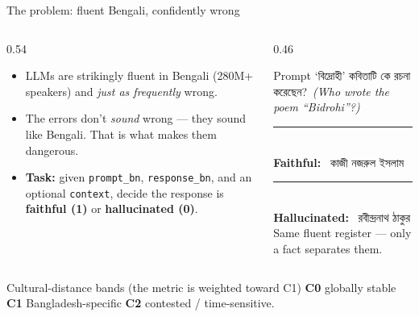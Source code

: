 \documentclass[aspectratio=169,11pt,t]{beamer}
\newcommand{\bn}[1]{{\bnfont #1}}
\newcommand{\bng}[2]{{\bnfont #1}~{\footnotesize\itshape\color{soft}(#2)}}
\newcommand{\metric}[1]{{\color{primary}\bfseries #1}}
\newcommand{\good}[1]{{\color{good}\bfseries #1}}
\newcommand{\bad}[1]{{\color{bad}\bfseries #1}}
\begin{document}
\begin{frame}{The problem: fluent Bengali, confidently wrong}
  \begin{columns}[T]
    \begin{column}{0.54\textwidth}
      \begin{itemize}
        \item LLMs are strikingly fluent in Bengali (280M+ speakers) and \emph{just as frequently} wrong.
        \item The errors don't \emph{sound} wrong — they sound like Bengali. That is what makes them dangerous.
        \item \textbf{Task:} given \texttt{prompt\_bn}, \texttt{response\_bn}, and an optional \texttt{context}, decide the response is \good{faithful (1)} or \bad{hallucinated (0)}.
      \end{itemize}
    \end{column}
    \begin{column}{0.46\textwidth}
      \small
      \begin{block}{Prompt}
        `\bn{বিদ্রোহী}' \bng{কবিতাটি কে রচনা করেছেন?}{Who wrote the poem ``Bidrohi''?}
      \end{block}
      \vspace{-0.2em}
      {\color{good}\rule{\linewidth}{1pt}}\\[-0.1em]
      \good{Faithful:}~ \bn{কাজী নজরুল ইসলাম}\\[0.5em]
      {\color{bad}\rule{\linewidth}{1pt}}\\[-0.1em]
      \bad{Hallucinated:}~ \bn{রবীন্দ্রনাথ ঠাকুর}\\[0.3em]
      {\footnotesize\color{soft} Same fluent register — only a fact separates them.}
    \end{column}
  \end{columns}
  \vspace{0.15em}
  \begin{block}{Cultural-distance bands \;\textmd{\small(the metric is weighted toward C1)}}
    \small \textbf{C0} globally stable \;\textbullet\; \metric{C1} Bangladesh-specific \;\textbullet\; \textbf{C2} contested / time-sensitive.
  \end{block}
\end{frame}
\end{document}
